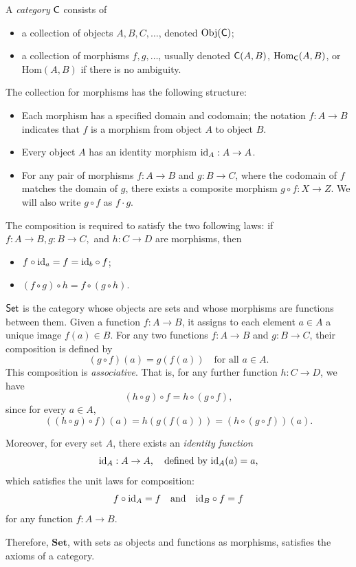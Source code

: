 \begin{definition}
   A \emph{category} $\mathsf{C}$ consists of
   \begin{itemize}
    \item a collection of objects $A, B, C, \ldots$, denoted $\text{Obj}(\mathsf{C})$;
    \item a collection of morphisms $f, g, \ldots $, usually denoted $\mathsf{C}(A,B)$, $\mathrm{Hom}_{\mathsf{C}}(A,B)$, or $\mathrm{Hom}(A,B)$ if there is no ambiguity. 
   \end{itemize}
    The collection for morphisms has the following structure:
    \begin{itemize}
      \item Each morphism has a specified domain and codomain; the notation $ f : A \to B $ indicates that $ f $ is a morphism from object $ A $ to object $ B $.  
       \item Every object $ A $ has an identity morphism $ \mathrm{id}_A : A \to A $.  
      \item For any pair of morphisms $ f : A \to B $ and $ g : B \to C $, where the codomain of $ f $ matches the domain of $ g $, there exists a composite morphism $ g \circ f : X \to Z $. We will also write $g \circ f$ as $f \cdot g$.
    \end{itemize}

     The composition is required to satisfy the two following laws: if $f : A \to B, g : B \to C,$ and $h:C \to D$ are morphisms, then
     \begin{itemize}
      \item  $f \circ \mathrm{id}_a = f = \mathrm{id}_b \circ f$;
      \item  $  (f \circ g) \circ h = f \circ (g \circ h) $.
     \end{itemize}
\end{definition}





\begin{example}
 $\mathsf{Set}$ is the category whose objects are sets and whose  morphisms are functions between them. Given a function \(f: A \to B\), it assigns to each element \(a \in A\) a unique image \(f(a) \in B\). 
 For any two functions \(f: A \to B\) and \(g: B \to C\), their composition is defined by
$$
(g \circ f)(a) = g(f(a)) \quad \text{for all } a \in A.
$$
This composition is \emph{associative}. That is, for any further function \(h: C \to D\), we have
\[
(h \circ g) \circ f = h \circ (g \circ f),
\]
since for every \(a \in A\),
\[
((h \circ g) \circ f)(a) = h(g(f(a))) = (h \circ (g \circ f))(a).
\]

Moreover, for every set \(A\), there exists an \emph{identity function}
\[
\mathrm{id}_A : A \to A, \quad \text{defined by } \mathrm{id}_A(a) = a,
\]
which satisfies the unit laws for composition:
\[
f \circ \mathrm{id}_A = f \quad \text{and} \quad \mathrm{id}_B \circ f = f
\]
for any function \(f: A \to B\).

Therefore, \(\mathbf{Set}\), with sets as objects and functions as morphisms, satisfies the axioms of a category.
\end{example}

